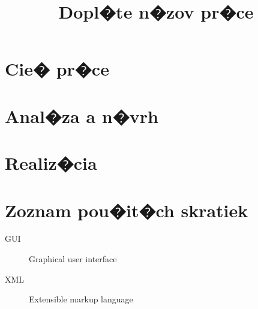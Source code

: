 \documentclass[thesis=M,slovak]{FITthesis}[2013/05/06]
\title{Dopl�te n�zov pr�ce}
\begin{document}

\begin{introduction}
\end{introduction}

\chapter{Cie� pr�ce}

\chapter{Anal�za a n�vrh}

\chapter{Realiz�cia}

\begin{conclusion}
\end{conclusion}




\appendix

\chapter{Zoznam pou�it�ch skratiek}
\begin{description}
	\item[GUI] Graphical user interface
	\item[XML] Extensible markup language
\end{description}
\end{document}
